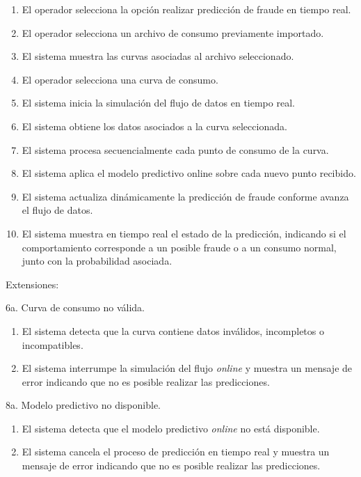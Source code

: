 \documentclass[12pt,a4paper]{report}
\begin{document}
\begin{enumerate}[leftmargin=1.5cm]
    \item El operador selecciona la opción realizar predicción de fraude en tiempo real.
    \item El operador selecciona un archivo de consumo previamente importado.
    \item El sistema muestra las curvas asociadas al archivo seleccionado.
    \item El operador selecciona una curva de consumo.
    \item El sistema inicia la simulación del flujo de datos en tiempo real.
    \item El sistema obtiene los datos asociados a la curva seleccionada.
    \item El sistema procesa secuencialmente cada punto de consumo de la curva.
    \item El sistema aplica el modelo predictivo online sobre cada nuevo punto recibido.
    \item El sistema actualiza dinámicamente la predicción de fraude conforme avanza el flujo de datos.
    \item El sistema muestra en tiempo real el estado de la predicción, indicando si el comportamiento corresponde a un posible fraude o a un consumo normal, junto con la probabilidad asociada.
\end{enumerate}
\medskip

\noindent Extensiones:

6a. Curva de consumo no válida.
\begin{enumerate}[leftmargin=1.5cm]
    \item El sistema detecta que la curva contiene datos inválidos, incompletos o incompatibles.
    \item El sistema interrumpe la simulación del flujo \emph{online} y muestra un mensaje de error indicando que no es posible realizar las predicciones.
\end{enumerate}

\medskip

8a. Modelo predictivo no disponible.
\begin{enumerate}[leftmargin=1.5cm]
    \item El sistema detecta que el modelo predictivo \emph{online} no está disponible.
    \item El sistema cancela el proceso de predicción en tiempo real y muestra un mensaje de error indicando que no es posible realizar las predicciones.
\end{enumerate}
\end{document}
